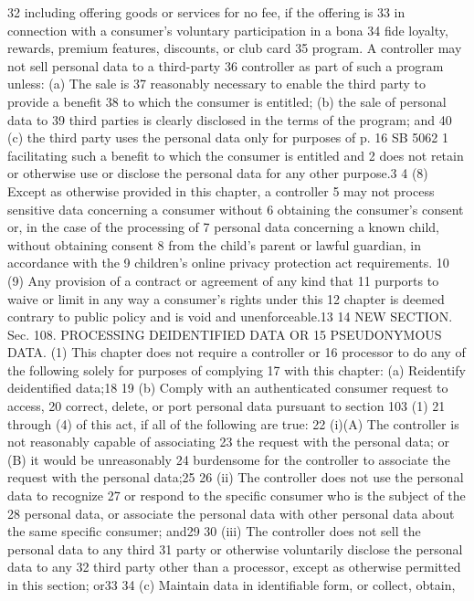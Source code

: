 32 including offering goods or services for no fee, if the offering is
33 in connection with a consumer's voluntary participation in a bona
34 fide loyalty, rewards, premium features, discounts, or club card
35 program. A controller may not sell personal data to a third-party
36 controller as part of such a program unless: (a) The sale is
37 reasonably necessary to enable the third party to provide a benefit
38 to which the consumer is entitled; (b) the sale of personal data to
39 third parties is clearly disclosed in the terms of the program; and
40 (c) the third party uses the personal data only for purposes of
p. 16 SB 5062
1 facilitating such a benefit to which the consumer is entitled and
2 does not retain or otherwise use or disclose the personal data for
any other purpose.3
4 (8) Except as otherwise provided in this chapter, a controller
5 may not process sensitive data concerning a consumer without
6 obtaining the consumer's consent or, in the case of the processing of
7 personal data concerning a known child, without obtaining consent
8 from the child's parent or lawful guardian, in accordance with the
9 children's online privacy protection act requirements.
10 (9) Any provision of a contract or agreement of any kind that
11 purports to waive or limit in any way a consumer's rights under this
12 chapter is deemed contrary to public policy and is void and
unenforceable.13
14 NEW SECTION. Sec. 108. PROCESSING DEIDENTIFIED DATA OR
15 PSEUDONYMOUS DATA. (1) This chapter does not require a controller or
16 processor to do any of the following solely for purposes of complying
17 with this chapter:
(a) Reidentify deidentified data;18
19 (b) Comply with an authenticated consumer request to access,
20 correct, delete, or port personal data pursuant to section 103 (1)
21 through (4) of this act, if all of the following are true:
22 (i)(A) The controller is not reasonably capable of associating
23 the request with the personal data; or (B) it would be unreasonably
24 burdensome for the controller to associate the request with the
personal data;25
26 (ii) The controller does not use the personal data to recognize
27 or respond to the specific consumer who is the subject of the
28 personal data, or associate the personal data with other personal
data about the same specific consumer; and29
30 (iii) The controller does not sell the personal data to any third
31 party or otherwise voluntarily disclose the personal data to any
32 third party other than a processor, except as otherwise permitted in
this section; or33
34 (c) Maintain data in identifiable form, or collect, obtain,
